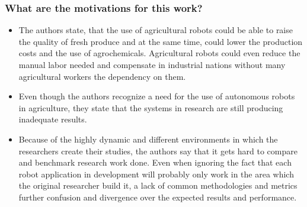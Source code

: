     \subsubsection*{What are the motivations for this work?}
    \begin{itemize}
        \item The authors state, that the use of agricultural robots could be able to raise the quality of fresh produce and at the same time, could lower the production costs and the use of agrochemicals. Agricultural robots could even reduce the manual labor needed and compensate in industrial nations without many agricultural workers the dependency on them.
        \item Even though the authors recognize a need for the use of autonomous robots in agriculture, they state that the systems in research are still producing inadequate results.
        \item Because of the highly dynamic and different environments in which the researchers create their studies, the authors say that it gets hard to compare and benchmark research work done. Even when ignoring the fact that each robot application in development will probably only work in the area which the original researcher build it, a lack of common methodologies and metrics further confusion and divergence over the expected results and performance.
    \end{itemize}
